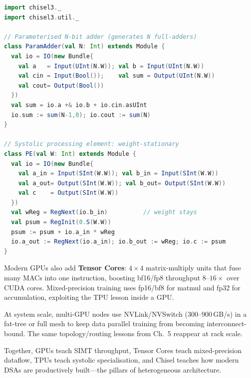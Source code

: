 \begin{lstlisting}[language=Scala, caption={Chisel: parameterised adder and systolic PE. Elaborates to Verilog.}]
import chisel3._
import chisel3.util._

// Parameterised N-bit adder (generates N full-adders)
class ParamAdder(val N: Int) extends Module {
  val io = IO(new Bundle{
    val a   = Input(UInt(N.W)); val b = Input(UInt(N.W))
    val cin = Input(Bool());    val sum = Output(UInt(N.W))
    val cout= Output(Bool())
  })
  val sum = io.a +& io.b + io.cin.asUInt
  io.sum := sum(N-1,0); io.cout := sum(N)
}

// Systolic processing element: weight-stationary
class PE(val W: Int) extends Module {
  val io = IO(new Bundle{
    val a_in = Input(SInt(W.W)); val b_in = Input(SInt(W.W))
    val a_out= Output(SInt(W.W)); val b_out= Output(SInt(W.W))
    val c    = Output(SInt(W.W))
  })
  val wReg = RegNext(io.b_in)          // weight stays
  val psum = RegInit(0.S(W.W))
  psum := psum + io.a_in * wReg
  io.a_out := RegNext(io.a_in); io.b_out := wReg; io.c := psum
}
\end{lstlisting}

Modern GPUs also add \textbf{Tensor Cores}: $4\times4$ matrix-multiply units that
fuse many MACs into one instruction, boosting bf16/fp8 throughput $8$--$16\times$
over CUDA cores. Mixed-precision training uses fp16/bf8 for matmul and fp32 for
accumulation, exploiting the TPU lesson inside a GPU.

At system scale, multi-GPU nodes use NVLink/NVSwitch (300--900\,GB/s) in a fat-tree
or full mesh to keep data parallel training from becoming interconnect-bound. The
same topology/routing lessons from Ch.~5 reappear at rack scale.

Together, GPUs teach SIMT throughput, Tensor Cores teach mixed-precision dataflow,
TPUs teach systolic specialisation, and Chisel teaches how modern DSAs are productively
built---the pillars of heterogeneous architecture.

